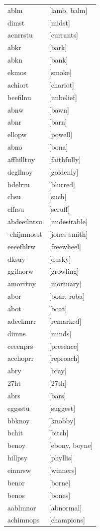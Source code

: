 \documentclass{article}
\begin{document}
\begin{tabular}{ll}
ablm & [lamb, balm] \\
dimst & [midst] \\
acnrrstu & [currants] \\
abkr & [bark] \\
abkn & [bank] \\
ekmos & [smoke] \\
achiort & [chariot] \\
beefilnu & [unbelief] \\
abnw & [bawn] \\
abnr & [barn] \\
ellopw & [powell] \\
abno & [bona] \\
affhilltuy & [faithfully] \\
degllnoy & [goldenly] \\
bdelrru & [blurred] \\
chsu & [such] \\
cffrsu & [scruff] \\
abdeeilnrsu & [undesirable] \\
-ehijmnosst & [jones-smith] \\
eeeefhlrw & [freewheel] \\
dksuy & [dusky] \\
ggilnorw & [growling] \\
amorrtuy & [mortuary] \\
abor & [boar, roba] \\
abot & [boat] \\
adeekmrr & [remarked] \\
dimns & [minds] \\
ceeenprs & [presence] \\
acehoprr & [reproach] \\
abry & [bray] \\
27ht & [27th] \\
abrs & [bars] \\
eggsstu & [suggest] \\
bbknoy & [knobby] \\
bchit & [bitch] \\
benoy & [ebony, boyne] \\
hillpsy & [phyllis] \\
einnrsw & [winners] \\
benor & [borne] \\
benos & [bones] \\
aablmnor & [abnormal] \\
achimnops & [champions] \\

\end{tabular}
\end{document}
